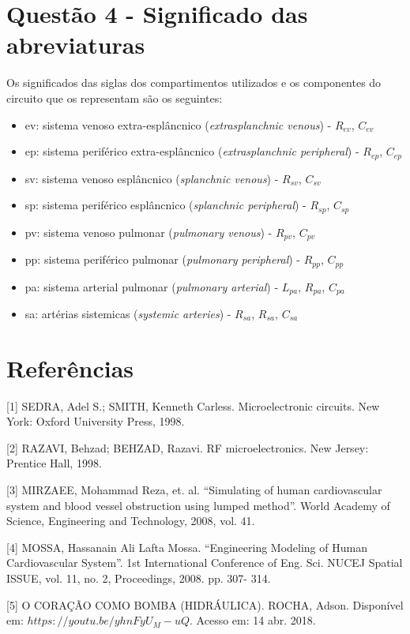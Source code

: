 \documentclass{abntex2}
\begin{document}
\section{Questão 4 - Significado das abreviaturas}

Os significados das siglas dos compartimentos utilizados e os componentes do circuito que os representam são os seguintes:

\begin{itemize}
  \item {ev: sistema venoso extra-esplâncnico (\emph{extrasplanchnic venous}) - $R_{ev}$, $C_{ev}$}
  \item {ep: sistema periférico extra-esplâncnico (\emph{extrasplanchnic peripheral}) - $R_{ep}$, $C_{ep}$}
  \item {sv: sistema venoso esplâncnico (\emph{splanchnic venous}) - $R_{sv}$, $C_{sv}$}
  \item {sp: sistema periférico esplâncnico (\emph{splanchnic peripheral}) - $R_{sp}$, $C_{sp}$}
  \item {pv: sistema venoso pulmonar (\emph{pulmonary venous}) - $R_{pv}$, $C_{pv}$}
  \item {pp: sistema periférico pulmonar (\emph{pulmonary peripheral}) - $R_{pp}$, $C_{pp}$}
  \item {pa: sistema arterial pulmonar (\emph{pulmonary arterial}) - $L_{pa}$, $R_{pa}$, $C_{pa}$}
  \item {sa: artérias sistemicas (\emph{systemic arteries}) - $R_{sa}$, $R_{sa}$, $C_{sa}$}
\end{itemize}

\section*{Referências}


[1] SEDRA, Adel S.; SMITH, Kenneth Carless. Microelectronic circuits. New York: Oxford University Press, 1998.

[2] RAZAVI, Behzad; BEHZAD, Razavi. RF microelectronics. New Jersey: Prentice Hall, 1998.

[3] MIRZAEE, Mohammad Reza, et. al. “Simulating of human cardiovascular system and blood vessel
obstruction using lumped method”. World Academy of Science, Engineering and Technology, 2008, vol.
41.

[4] MOSSA, Hassanain Ali Lafta Mossa. “Engineering Modeling of Human Cardiovascular System”. 1st
International Conference of Eng. Sci. NUCEJ Spatial ISSUE, vol. 11, no. 2, Proceedings, 2008. pp. 307-
314.

[5] O CORAÇÃO COMO BOMBA (HIDRÁULICA). ROCHA,  Adson. Disponível em: $https://youtu.be/yhnFyU_M-uQ$. Acesso em: 14 abr. 2018.
\end{document}
